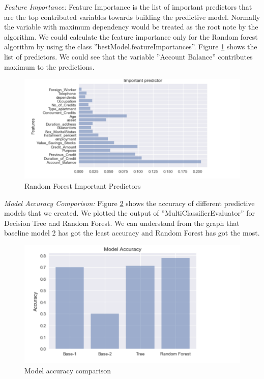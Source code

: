 \documentclass[sigconf]{acmart}
\begin{document}
\textit{Feature Importance:} Feature Importance is the list of important predictors that are the top contributed variables towards building the predictive model. Normally the variable with maximum dependency would be treated as the root note by the algorithm. We could calculate the feature importance only for the Random forest algorithm by using the class ''bestModel.featureImportances''. Figure \ref{fig:Figure24} shows the list of predictors. We could see that the variable ''Account Balance'' contributes maximum to the predictions. 

\begin{figure}[htb]
  \centering
  \includegraphics[width=1.0\columnwidth]{images/Figure24.png}
  \caption{Random Forest Important Predictors}
  \label{fig:Figure24} 
\end{figure}

\textit{Model Accuracy Comparison:} Figure \ref{fig:Figure25} shows the accuracy of different predictive models that we created. We plotted the output of ''MultiClassifierEvaluator'' for Decision Tree and Random Forest. We can understand from the graph that baseline model 2 has got the least accuracy and Random Forest has got the most. 

\begin{figure}[htb]
  \centering
  \includegraphics[width=1.0\columnwidth]{images/Figure25.png}
  \caption{Model accuracy comparison}
  \label{fig:Figure25} 
\end{figure}
\end{document}
